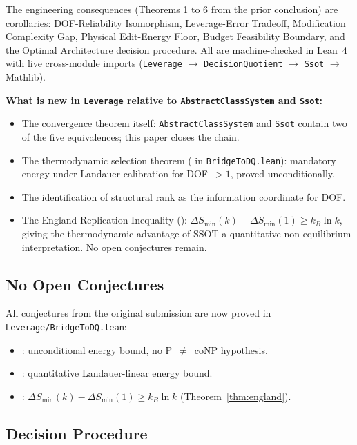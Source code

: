 The engineering consequences (Theorems 1 to 6 from the prior conclusion) are corollaries: DOF-Reliability Isomorphism, Leverage-Error Tradeoff, Modification Complexity Gap, Physical Edit-Energy Floor, Budget Feasibility Boundary, and the Optimal Architecture decision procedure. All are machine-checked in Lean~4 with live cross-module imports (\nolinkurl{Leverage} $\to$ \nolinkurl{DecisionQuotient} $\to$ \nolinkurl{Ssot} $\to$ Mathlib).

\textbf{What is new in \nolinkurl{Leverage} relative to \nolinkurl{AbstractClassSystem} and \nolinkurl{Ssot}:}
\begin{itemize}
\item The convergence theorem itself: \nolinkurl{AbstractClassSystem} and \nolinkurl{Ssot} contain two of the five equivalences; this paper closes the chain.
\item The thermodynamic selection theorem ( in \nolinkurl{BridgeToDQ.lean}): mandatory energy under Landauer calibration for DOF~$> 1$, proved unconditionally.
\item The identification of structural rank as the information coordinate for DOF.
\item The England Replication Inequality (): $\Delta S_{\min}(k) - \Delta S_{\min}(1) \geq k_B \ln k$, giving the thermodynamic advantage of SSOT a quantitative non-equilibrium interpretation. No open conjectures remain.
\end{itemize}

\subsection{No Open Conjectures}

All conjectures from the original submission are now proved in \nolinkurl{Leverage/BridgeToDQ.lean}:
\begin{itemize}
\item {}: unconditional energy bound, no P~$\neq$~coNP hypothesis.
\item {}: quantitative Landauer-linear energy bound.
\item {}: $\Delta S_{\min}(k) - \Delta S_{\min}(1) \geq k_B \ln k$ (Theorem~\ref{thm:england}).
\end{itemize}

\subsection{Decision Procedure}

